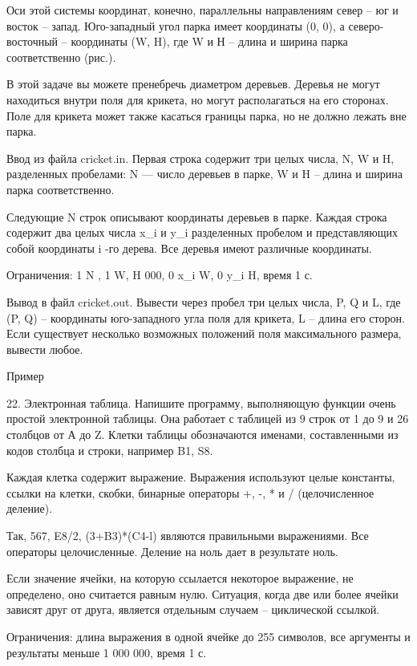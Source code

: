 \documentclass[]{article}
\begin{document}
Оси этой системы координат, конечно, параллельны направлениям север – юг и восток – запад. Юго-западный угол парка имеет координаты (0, 0), а северо-восточный – координаты (W, H), где W и Н – длина и ширина парка соответственно (рис.).

В этой задаче вы можете пренебречь диаметром деревьев. Деревья не могут находиться внутри поля для крикета, но могут располагаться на его сторонах. Поле для крикета может также касаться границы парка, но не должно лежать вне парка.

Ввод из файла cricket.in. Первая строка содержит три целых числа, N, W и H, разделенных пробелами: N — число деревьев в парке, W и H – длина и ширина парка соответственно.

Следующие N строк описывают координаты деревьев в парке. Каждая строка содержит два целых числа x_i и y_i разделенных пробелом и представляющих собой координаты i -го дерева. Все деревья имеют различные координаты.

Ограничения: 1 \leq N , 1 \leq W, H  000, 0 \leq x_i \leq W, 0 \leq y_i \leq H, время 1 с.

Вывод в файл cricket.out. Вывести через пробел три целых числа, P, Q и L, где (P, Q) – координаты юго-западного угла поля для крикета, L – длина его сторон. Если существует несколько возможных положений поля максимального размера, вывести любое.

Пример



22. Электронная таблица. Напишите программу, выполняющую функции очень простой электронной таблицы. Она работает с таблицей из 9 строк от 1 до 9 и 26 столбцов от А до Z. Клетки таблицы обозначаются именами, составленными из кодов столбца и строки, например B1, S8.

Каждая клетка содержит выражение. Выражения используют целые константы, ссылки на клетки, скобки, бинарные операторы +, -, * и / (целочисленное деление).

Так, 567, E8/2, (3+B3)*(C4-l) являются правильными выражениями. Все операторы целочисленные. Деление на ноль дает в результате ноль.

Если значение ячейки, на которую ссылается некоторое выражение, не определено, оно считается равным нулю. Ситуация, когда две или более ячейки зависят друг от друга, является отдельным случаем – циклической ссылкой.

Ограничения: длина выражения в одной ячейке до 255 символов, все аргументы и результаты меньше 1 000 000, время 1 с.
\end{document}
